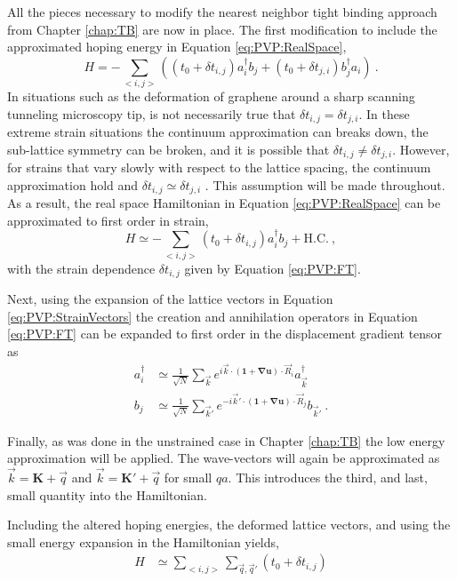 All the pieces necessary to modify the nearest neighbor tight binding approach from Chapter \ref{chap:TB} are now in place.
The first modification to include the approximated hoping energy in Equation \ref{eq:PVP:RealSpace},
\begin{equation*}
  H=-\sum_{<i,j>} \left( (t_0+\delta t_{i,j})  a_i^{\dagger} b_j + (t_0+\delta t_{j,i}) b_j^{\dagger} a_i \right) \ .
\end{equation*}
In situations such as the deformation of graphene around a sharp scanning tunneling microscopy tip, is not necessarily true that $\delta t_{i,j} = \delta t_{j,i}$.
In these extreme strain situations the continuum approximation can breaks down, the sub-lattice symmetry can be broken, and it is possible that $\delta t_{i,j} \neq \delta t_{j,i}$.
However, for strains that vary slowly with respect to the lattice spacing, the continuum approximation hold and $\delta t_{i,j} \simeq \delta t_{j,i}$ \cite{Sloan2013}.
This assumption will be made throughout.
As a result, the real space Hamiltonian in Equation \ref{eq:PVP:RealSpace} can be approximated to first order in strain,
\begin{equation*}
  H \simeq -\sum_{<i,j>} \left( t_0+\delta t_{i,j} \right)  a_i^{\dagger} b_j + \text{H.C.} \ ,
\end{equation*}
with the strain dependence $\delta t_{i,j}$ given by Equation \ref{eq:PVP:FT}.

Next, using the expansion of the lattice vectors in Equation \ref{eq:PVP:StrainVectors} the creation and annihilation operators in Equation \ref{eq:PVP:FT} can be expanded to first order in the displacement gradient tensor as
\begin{align*}
  a_i^{\dagger}&\simeq \frac{1}{\sqrt{N}}\sum_{\vec{k} } e^{ i \vec{k}  \cdot (\bm{1}+\bm{\nabla u}) \cdot\vec{R}_i}
      a_{\vec{k} }^{\dagger} \nonumber \\
  b_j          &\simeq \frac{1}{\sqrt{N}}\sum_{\vec{k}'} e^{-i \vec{k}' \cdot (\bm{1}+\bm{\nabla u}) \cdot \vec{R}_j}
      b_{\vec{k}'} \ .
\end{align*}

Finally, as was done in the unstrained case in Chapter \ref{chap:TB} the low energy approximation will be applied.
The wave-vectors will again be approximated as $\vec{k}=\bm{K}+\vec{q}$ and $\vec{k}=\bm{K'}+\vec{q}$ for small $qa$.
This introduces the third, and last, small quantity into the Hamiltonian.

Including the altered hoping energies, the deformed lattice vectors, and using the small energy expansion in the Hamiltonian yields,
\begin{align}
  H&\simeq \sum_{<i,j>} \sum_{\vec{q},\vec{q}'} (t_0+\delta t_{i,j})
\end{align}


